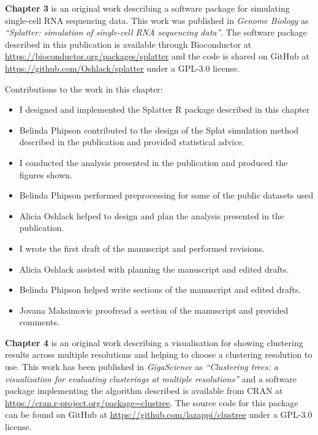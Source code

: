 \documentclass[11pt,a4paper,titlepage,twoside,openright]{style/unimelbthesis}
\theoremstyle{definition}
\theoremstyle{definition}
\theoremstyle{definition}
\theoremstyle{remark}
\begin{document}
\begin{frontmatter}
\begin{preface}
    \textbf{Chapter 3} is an original work describing a software package for simulating single-cell RNA sequencing data. This work was published in \emph{Genome Biology} as \emph{``Splatter: simulation of single-cell RNA sequencing data''}. The software package described in this publication is available through Bioconductor at \url{https://bioconductor.org/packages/splatter} and the code is shared on GitHub at \url{https://github.com/Oshlack/splatter} under a GPL-3.0 license.
    
    Contributions to the work in this chapter:
    
    \begin{itemize}
    \tightlist
    \item
      I designed and implemented the Splatter R package described in this chapter
    \item
      Belinda Phipson contributed to the design of the Splat simulation method described in the publication and provided statistical advice.
    \item
      I conducted the analysis presented in the publication and produced the figures shown.
    \item
      Belinda Phipson performed preprocessing for some of the public datasets used
    \item
      Alicia Oshlack helped to design and plan the analysis presented in the publication.
    \item
      I wrote the first draft of the manuscript and performed revisions.
    \item
      Alicia Oshlack assisted with planning the manuscript and edited drafts.
    \item
      Belinda Phipson helped write sections of the manuscript and edited drafts.
    \item
      Jovana Maksimovic proofread a section of the manuscript and provided comments.
    \end{itemize}
    
    \textbf{Chapter 4} is an original work describing a visualisation for showing clustering results across multiple resolutions and helping to choose a clustering resolution to use. This work has been published in \emph{GigaScience} as \emph{``Clustering trees: a visualization for evaluating clusterings at multiple resolutions''} and a software package implementing the algorithm described is available from CRAN at \url{https://cran.r-project.org/package=clustree}. The source code for this package can be found on GitHub at \url{https://github.com/lazappi/clustree} under a GPL-3.0 license.
    

\end{preface}
\end{frontmatter}
\end{document}
